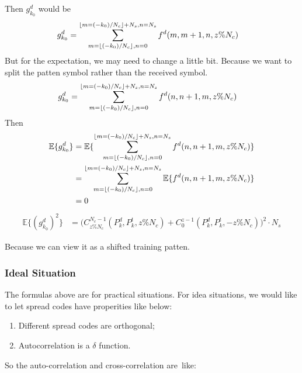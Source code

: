 \documentclass[a4paper]{article}
\DeclarePairedDelimiter\floor{\lfloor}{\rfloor}
\begin{document}
Then $g_{k_0}^d$ would be 
\begin{align}
	g^d_{k_0}
	&= \sum_{m = \floor{(-k_0)/N_c}, n = 0}^{\floor{m=(-k_0)/N_c} + N_s, n = N_s} f^d(m, m+1, n, z\%N_c)
\end{align}
But for the expectation, we may need to change a little bit. Because we want to split the patten symbol rather than the received symbol.
\begin{align}
	g^d_{k_0}
	&= \sum_{m = \floor{(-k_0)/N_c}, n = 0}^{\floor{m=(-k_0)/N_c} + N_s, n = N_s} f^d(n, n+1, m, z\%N_c)
\end{align}
Then
\begin{align}
	\mathbb{E}\{g^d_{k_0}\} 
	&= \mathbb{E}\{\sum_{m = \floor{(-k_0)/N_c}, n = 0}^{\floor{m=(-k_0)/N_c} + N_s, n = N_s} f^d(n, n+1, m, z\%N_c)\}\\
	&= \sum_{m = \floor{(-k_0)/N_c}, n = 0}^{\floor{m=(-k_0)/N_c} + N_s, n = N_s} \mathbb{E}\{f^d(n, n+1, m, z\%N_c)\}\\
	&= 0
\end{align}
\begin{align}
	\mathbb{E} \{(g^d_{k_0})^2\}
	&= \bigg(C_{z\%N_c}^{N_c-1}(P^d_k, P^t_k, z\%N_c) + C_0^{z-1}(P^d_k, P^t_k, -z\%N_c)\bigg)^2 \cdot N_s
\end{align}

Because we can view it as a shifted training patten.


\subsubsection{Ideal Situation} %
\label{ssub:ideal_situation}

The formulas above are for practical situations. For idea situations, we would like to let spread codes have properities like below:

\begin{enumerate}
	\item Different spread codes are orthogonal;
	\item Autocorrelation is a $\delta$ function.
\end{enumerate}

So the auto-correlation and cross-correlation are like:
\end{document}
